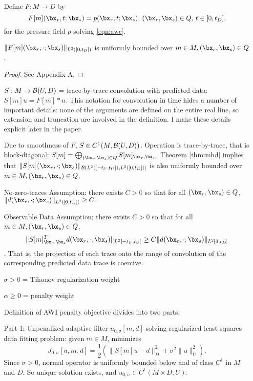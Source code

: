 Define $F: M \rightarrow D$ by
\[
  F[m](\bx_r,t;\bx_s) = p(\bx_r,t;\bx_s), \, (\bx_r,\bx_s) \in Q, \, t \in [0,t_D],
\]
for the pressure field $p$ solving \ref{eqn:awe}.

\begin{theorem}
  \label{thm:mbd}
  $\|F[m](\bx_r,\cdot;\bx_s)\|_{L^2([0,t_D])}$ is uniformly bounded over $m \in M, (\bx_r,\bx_s) \in Q$.
\end{theorem}
\begin{proof}
  See Appendix A.
\end{proof}

$S: M \rightarrow {\cal B}(U,D)$ = trace-by-trace convolution with predicted data: $S[m]u = F[m] * u$. This notation for convolution in time hides a number of important details: none of the arguments are defined on the entire real line, so extension and truncation are involved in the definition. I make these details explicit later in the paper.

Due to smoothness of $F$, $S \in C^1(M,{\cal B}(U,D))$. Operation is trace-by-trace, that is block-diagonal: $S[m] = \bigoplus_{(\bx_r,\bx_s) \in Q}S[m]_{\bx_r,\bx_s}$. Theorem \ref{thm:mbd} implies that $\|S[m](\bx_r,\cdot;\bx_s)\|_{{\cal B}(L^2([-t_U,t_U]),L^2([0,t_D]))}$ is also uniformly bounded over $m \in M, (\bx_r,\bx_s) \in Q$.

No-zero-traces Assumption: there exists $C>0$ so that for all $(\bx_r,\bx_s) \in Q$,
$\|d(\bx_r,\cdot;\bx_s)\|_{L^2([0,t_D])} \ge C.$

Observable Data Assumption: there exists $C>0$ so that for all $m \in M, (\bx_r,\bx_s) \in Q$,
\begin{equation}
  \label{eqn:obsdata}
  \|S[m]_{\bx_r,\bx_s}^Td(\bx_r,\cdot;\bx_s)\|_{L^2[-t_U,t_U]} \ge C \|d(\bx_r,\cdot;\bx_s)\|_{L^2[0,t_D]}
\end{equation}.
That is, the projection of each trace onto the range of convolution of the corresponding predicted data trace is coercive.  

$\sigma > 0$ = Tihonov regularization weight

$\alpha \ge 0$ = penalty weight

Definition of AWI penalty objective divides into two parts:

Part 1: Unpenalized adaptive filter $u_{0,\sigma}[m,d]$ solving regularized least squares data fitting problem:  given $m \in M$, minimizes
\[
 J_{0,\sigma}[u,m,d] = \frac{1}{2}(\|S[m]u - d\|_D^2 + \sigma^2 \|u\|^2_U).
\]
Since $\sigma > 0$, normal operator is uniformly bounded below and of class $C^1$ in $M$ and $D$. So unique solution exists, and $u_{0,\sigma} \in C^1(M \times D, U)$.

